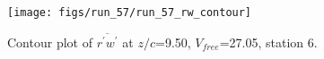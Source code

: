 \begin{figure}[H]
\centering
\texttt{[image: figs/run\_57/run\_57\_rw\_contour]}
\caption{Contour plot of $\overline{r^\prime w^\prime}$ at $z/c$=9.50, $V_{free}$=27.05, station 6.}
\label{fig:run_57_rw_contour}
\end{figure}


